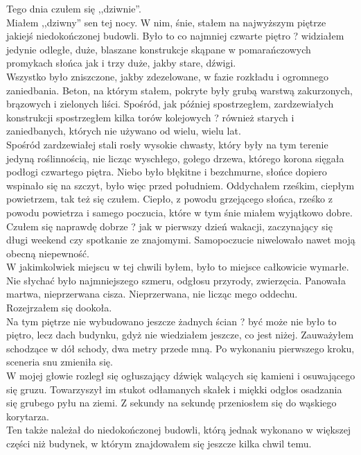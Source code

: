\documentclass[../MAIN.tex]{subfiles}
\begin{document}
\qd
% 
% 
% 
Tego dnia czułem się ,,dziwnie''.\\
Miałem ,,dziwny'' sen tej nocy. W nim, śnie, stałem na najwyższym piętrze jakiejś niedokończonej budowli. Było to co najmniej czwarte piętro ? widziałem jedynie odległe, duże, blaszane konstrukcje skąpane w pomarańczowych promykach słońca jak i trzy duże, jakby stare, dźwigi.\\
Wszystko było zniszczone, jakby zdezelowane, w fazie rozkładu i ogromnego zaniedbania. Beton, na którym stałem, pokryte były grubą warstwą zakurzonych, brązowych i zielonych liści. Spośród, jak później spostrzegłem, zardzewiałych konstrukcji spostrzegłem kilka torów kolejowych ? również starych i zaniedbanych, których nie używano od wielu, wielu lat.\\
Spośród zardzewiałej stali rosły wysokie chwasty, który były na tym terenie jedyną roślinnością, nie licząc wyschłego, gołego drzewa, którego korona sięgała podłogi czwartego piętra.
Niebo było błękitne i bezchmurne, słońce dopiero wspinało się na szczyt, było więc przed południem. Oddychałem rześkim, ciepłym powietrzem, tak też się czułem. Ciepło, z powodu grzejącego słońca, rześko z powodu powietrza i samego poczucia, które w tym śnie miałem wyjątkowo dobre. Czułem się naprawdę dobrze ? jak w pierwszy dzień wakacji, zaczynający się długi weekend czy spotkanie ze znajomymi. Samopoczucie niwelowało nawet moją obecną niepewność.\\
W jakimkolwiek miejscu w tej chwili byłem, było to miejsce całkowicie wymarłe. Nie słychać było najmniejszego szmeru, odgłosu przyrody, zwierzęcia. Panowała martwa, nieprzerwana cisza. Nieprzerwana, nie licząc mego oddechu.\\
Rozejrzałem się dookoła.\\
Na tym piętrze nie wybudowano jeszcze żadnych ścian ? być może nie było to piętro, lecz dach budynku, gdyż nie wiedziałem jeszcze, co jest niżej. Zauważyłem schodzące w dół schody, dwa metry przede mną. Po wykonaniu pierwszego kroku, sceneria snu zmieniła się.\\
W mojej głowie rozległ się ogłuszający dźwięk walących się kamieni i osuwającego się gruzu. Towarzyszył im stukot odłamanych skałek i miękki odgłos osadzania się grubego pyłu na ziemi. Z sekundy na sekundę przeniosłem się do wąskiego korytarza.\\
Ten także należał do niedokończonej budowli, którą jednak wykonano w większej części niż budynek, w którym znajdowałem się jeszcze kilka chwil temu.\\
\end{document}
